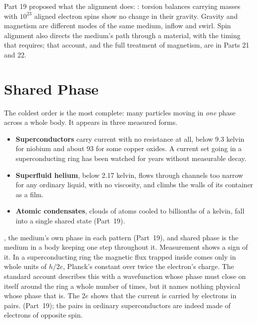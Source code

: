 \documentclass[11pt,a4paper]{article}
\begin{document}
Part 19 proposed what the alignment does:  : torsion balances carrying masses with $10^{23}$ aligned electron spins show no change in their gravity. Gravity and magnetism are different modes of the same medium, inflow and swirl. Spin alignment also directs the medium's path through a material, with the timing that requires; that account, and the full treatment of magnetism, are in Parts 21 and 22.

\section{Shared Phase}
\label{sec:shared}

\begin{argbar}
The coldest order is the most complete: many particles moving in \emph{one} phase across a whole body. It appears in three measured forms.
\begin{itemize}
\item \textbf{Superconductors} carry current with no resistance at all, below 9.3 kelvin for niobium and about 93 for some copper oxides. A current set going in a superconducting ring has been watched for years without measurable decay.
\item \textbf{Superfluid helium}, below 2.17 kelvin, flows through channels too narrow for any ordinary liquid, with no viscosity, and climbs the walls of its container as a film.\footnotemark{}\footnotemark{}
\item \textbf{Atomic condensates}, clouds of atoms cooled to billionths of a kelvin, fall into a single shared state (Part~19).
\end{itemize}
\end{argbar}
\addtocounter{footnote}{-1}

, the medium's own phase in each pattern (Part~19), and shared phase is the medium in a body keeping one step throughout it. Measurement shows a sign of it. In a superconducting ring the magnetic flux trapped inside comes only in whole units of $h/2e$, Planck's constant over twice the electron's charge. The standard account describes this with a wavefunction whose phase must close on itself around the ring a whole number of times, but it names nothing physical whose phase that is.  The $2e$ shows that the current is carried by electrons in pairs.  (Part~19); the pairs in ordinary superconductors are indeed made of electrons of opposite spin.
\end{document}
